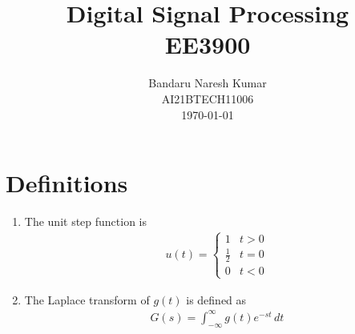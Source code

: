 \documentclass[journal,12pt,twocolumn]{IEEEtran}
\numberwithin{equation}{section}
\renewcommand\thesection{\arabic{section}}
\begin{document}
                             
\title{ Digital Signal Processing  \\ 
	\Large EE3900
}
\author{Bandaru Naresh Kumar \\ \normalsize AI21BTECH11006 \\ \vspace*{20pt} \normalsize \today  }
 \maketitle 
 \tableofcontents
 \section{Definitions}
\begin{enumerate}[label=\arabic*.,ref=\thesection.\theenumi]
\item The unit step function is 
\begin{align}
\label{eq:unit-step}
u(t) =
\begin{cases}
1 & t > 0
\\
	\frac{1}{2} & t = 0
\\
0 & t < 0
\end{cases}
\end{align}
\item The Laplace transform of $g(t)$ is defined as 
\begin{align}
	G(s) = \int_{-\infty}^{\infty} g(t) e^{-st}\, dt
\end{align}
 \end{enumerate}
\end{document}
